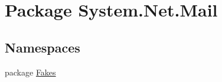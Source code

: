 \hypertarget{namespace_system_1_1_net_1_1_mail}{\section{Package System.\-Net.\-Mail}
\label{namespace_system_1_1_net_1_1_mail}
}
\subsection*{Namespaces}
\begin{DoxyCompactItemize}
\item 
package \hyperlink{namespace_system_1_1_net_1_1_mail_1_1_fakes}{Fakes}
\end{DoxyCompactItemize}

